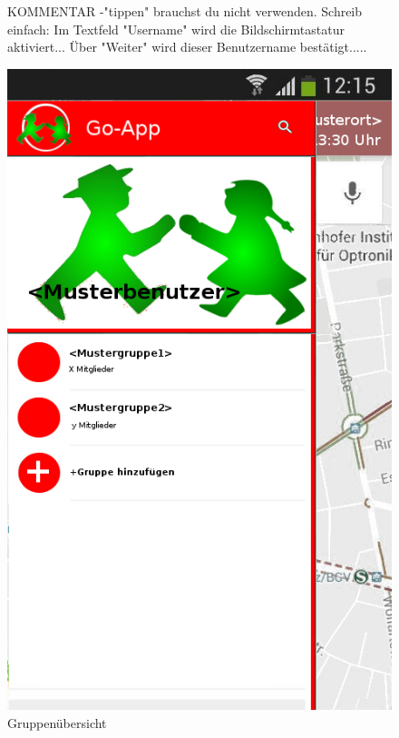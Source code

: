 \begin{figure} [H]
{	KOMMENTAR
	-"tippen" brauchst du nicht verwenden. Schreib einfach: Im Textfeld "Username" wird die Bildschirmtastatur aktiviert...
															Über "Weiter"  wird dieser Benutzername bestätigt..... 
	
}
\end{figure}

\begin{figure} [H]
	\caption{Gruppenübersicht}
\begin{center}
	\includegraphics[scale = 0.5]{resources/images/gruppenuebersicht.png}
\end{center}
\end{figure}

